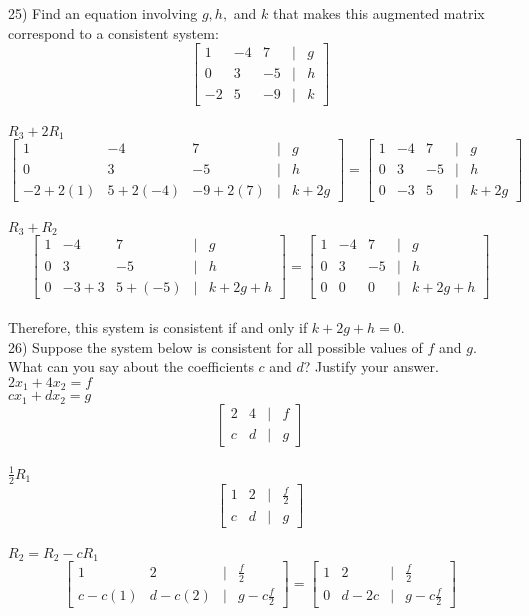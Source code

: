 \documentclass[]{article}
\begin{document}
25) Find an equation involving $g, h,$ and $k$ that makes this augmented matrix correspond to a consistent system:
\[
\begin{bmatrix}
	1&-4&7&|&g\\
	0&3&-5&|&h\\
	-2&5&-9&|&k
\end{bmatrix}
\]\\
$R_3+2R_1$
\[
\begin{bmatrix}
	1&-4&7&|&g\\
	0&3&-5&|&h\\
	-2+2(1)&5+2(-4)&-9+2(7)&|&k+2g
\end{bmatrix}=
\begin{bmatrix}
	1&-4&7&|&g\\
	0&3&-5&|&h\\
	0&-3&5&|&k+2g
\end{bmatrix}
\]\\
$R_3+R_2$
\[
\begin{bmatrix}
	1&-4&7&|&g\\
	0&3&-5&|&h\\
	0&-3+3&5+(-5)&|&k+2g+h
\end{bmatrix}=
\begin{bmatrix}
	1&-4&7&|&g\\
	0&3&-5&|&h\\
	0&0&0&|&k+2g+h
\end{bmatrix}
\]\\
Therefore, this system is consistent if and only if $k+2g+h = 0$.\\

26) Suppose the system below is consistent for all possible values of $f$ and $g$. What can you say about the coefficients $c$ and $d$? Justify your answer.\\
$2x_1+4x_2=f$\\
$cx_1+dx_2=g$\\
\[
\begin{bmatrix}
	2&4&|&f\\
	c&d&|&g
\end{bmatrix}
\]\\
$\frac{1}{2}R_1$
\[
\begin{bmatrix}
	1&2&|&\frac{f}{2}\\
	c&d&|&g
\end{bmatrix}
\]\\
$R_2 = R_2-cR_1$
\[
\begin{bmatrix}
	1&2&|&\frac{f}{2}\\
	c-c(1)&d-c(2)&|&g-c\frac{f}{2}
\end{bmatrix}=
\begin{bmatrix}
	1&2&|&\frac{f}{2}\\
	0&d-2c&|&g-c\frac{f}{2}
\end{bmatrix}
\]\\
\end{document}
